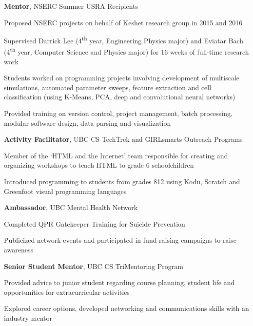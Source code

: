 \documentclass[margin,line]{res}
\newenvironment{list3}{
  \begin{list}{\textopenbullet}{
      \setlength{\itemsep}{0in}
      \setlength{\parsep}{0in} \setlength{\parskip}{0in}
      \setlength{\topsep}{0in} \setlength{\partopsep}{0in} 
      \setlength{\leftmargin}{0.1in}}}{\end{list}}
\begin{document}
\begin{resume}
{\bf Mentor}, NSERC Summer USRA Recipients\\
\vspace*{-.2cm}
\begin{list3}
\setlength\itemsep{0.3em}
\item Proposed NSERC projects on behalf of Keshet research group in 2015 and 2016
\item Supervised Darrick Lee (4\textsuperscript{th} year, Engineering Physics major) and Eviatar Bach (4\textsuperscript{th} year, Computer Science and Physics major) for 16 weeks of full-time research work
\item Students worked on programming projects involving development of multiscale simulations, automated parameter sweeps, feature extraction and cell classification (using K-Means, PCA, deep and convolutional neural networks)   
\item Provided training on version control, project management, batch processing, modular software design, data parsing and visualization
\end{list3}
\vspace*{.05cm}

{\bf Activity Facilitator}, UBC CS TechTrek and GIRLsmarts Outreach Programs\\
\vspace*{-.2cm}
\begin{list3}
\setlength\itemsep{0.3em}
\item Member of the `HTML and the Internet' team responsible for creating and organizing workshops to teach HTML to grade 6 schoolchildren
\item Introduced programming to students from grades 8{\textendash}12 using Kodu, Scratch and Greenfoot visual programming languages
\end{list3}
\vspace*{.05cm}

{\bf Ambassador}, UBC Mental Health Network\\
\vspace*{-.2cm}
\begin{list3}
\setlength\itemsep{0.3em}
\item Completed QPR Gatekeeper Training for Suicide Prevention
\item Publicized network events and participated in fund-raising campaigns to raise awareness
\end{list3}
\vspace*{.05cm}

{\bf Senior Student Mentor}, UBC CS Tri{\textendash}Mentoring Program\\
\vspace*{-.2cm}
\begin{list3}
\setlength\itemsep{0.3em}
\item Provided advice to junior student regarding course planning, student life and opportunities for extracurricular activities
\item Explored career options, developed networking and communications skills with an industry mentor
\end{list3}

\end{resume}
\end{document}
